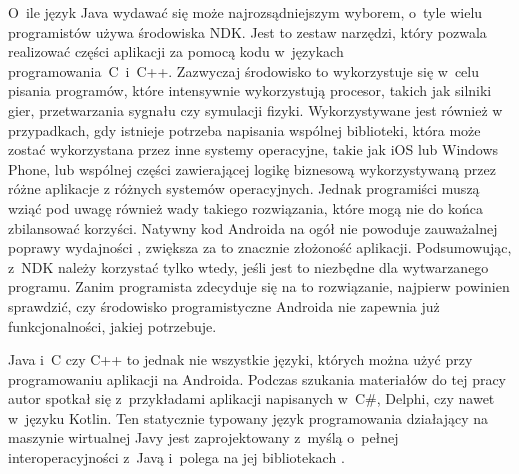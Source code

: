 O~ile język Java wydawać się może najrozsądniejszym wyborem, o~tyle wielu programistów używa środowiska NDK. Jest to zestaw narzędzi, który pozwala realizować części aplikacji za pomocą kodu w~językach programowania~C~i~C++. Zazwyczaj środowisko to wykorzystuje się w~celu pisania programów, które intensywnie wykorzystują procesor, takich jak silniki gier, przetwarzania sygnału czy symulacji fizyki. Wykorzystywane jest również w przypadkach, gdy istnieje potrzeba napisania wspólnej biblioteki, która może zostać wykorzystana przez inne systemy operacyjne, takie jak iOS lub Windows Phone, lub wspólnej części zawierającej logikę biznesową wykorzystywaną przez różne aplikacje z różnych systemów operacyjnych. Jednak programiści muszą wziąć pod uwagę również wady takiego rozwiązania, które mogą nie do końca zbilansować korzyści. Natywny kod Androida na ogół nie powoduje zauważalnej poprawy wydajności \cite{website:java:wydajnosc}, zwiększa za to znacznie złożoność aplikacji. Podsumowując, z~NDK należy korzystać tylko wtedy, jeśli jest to niezbędne dla wytwarzanego programu. Zanim programista zdecyduje się na to rozwiązanie, najpierw powinien sprawdzić, czy środowisko programistyczne Androida nie zapewnia już funkcjonalności, jakiej potrzebuje.

Java i~C czy C++ to jednak nie wszystkie języki, których można użyć przy programowaniu aplikacji na Androida. Podczas szukania materiałów do tej pracy autor spotkał się z~przykładami aplikacji napisanych w~C\#, Delphi, czy nawet w~języku Kotlin. Ten statycznie typowany język programowania działający na maszynie wirtualnej Javy jest zaprojektowany z~myślą o~pełnej interoperacyjności z~Javą i~polega na jej bibliotekach \cite{website:wikipedia}. %





